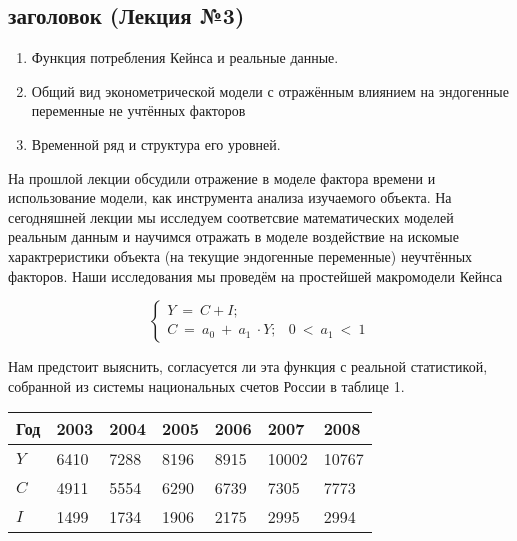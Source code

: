 \documentclass[12pt,a4paper]{article}
\author{GH-TIMe, KoryakinAK}
\begin{document}
\begin{center}
\section*{заголовок (Лекция №3)}
\end{center}

\begin{enumerate}
\item Функция потребления Кейнса и реальные данные.
\item Общий вид эконометрической модели с отражённым влиянием на эндогенные переменные не учтённых факторов
\item Временной ряд и структура его уровней.
\end{enumerate}

	На прошлой лекции обсудили отражение в моделе фактора времени и использование модели, как инструмента анализа изучаемого объекта. На сегодняшней лекции мы исследуем соответсвие математических моделей реальным данным и научимся отражать в моделе воздействие на искомые характреристики объекта (на текущие эндогенные переменные) неучтённых факторов. Наши исследования мы проведём на простейшей макромодели Кейнса


\begin{equation*}
\begin{cases}
Y\ =\ C+I; & \\
C\ =\ a_{0} \ +\ a_{1} \ \cdot Y; & 0\ < \ a_{1} \ < \ 1
\end{cases}
\end{equation*}

Нам предстоит выяснить, согласуется ли эта функция с реальной статистикой, собранной из системы национальных счетов России в таблице 1.

\begin{tabular}{|p{}|p{}|p{}|p{}|p{}|p{}|p{}|}
\hline
 Год & 2003 & 2004 & 2005 & 2006 & 2007 & 2008 \\
\hline
 $\displaystyle Y$ & 6410 & 7288 & 8196 & 8915 & 10002 & 10767 \\
\hline
 $\displaystyle C$ & 4911 & 5554 & 6290 & 6739 & 7305 & 7773 \\
\hline
 $\displaystyle I$ & 1499 & 1734 & 1906 & 2175 & 2995 & 2994 \\
 \hline
\end{tabular}

\end{document}
